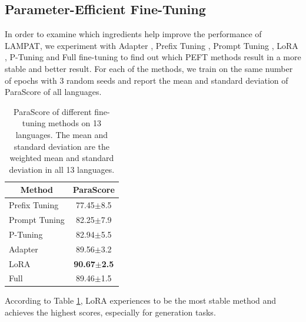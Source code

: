\documentclass[letterpaper]{article} %
\begin{document}
\subsection{Parameter-Efficient Fine-Tuning}
In order to examine which ingredients help improve the performance of LAMPAT, we experiment with Adapter \citep{pmlr-v97-houlsby19a}, Prefix Tuning \citep{li-liang-2021-prefix}, Prompt Tuning \citep{lester-etal-2021-power}, LoRA \citep{hu2021lora}, P-Tuning \citep{liu-etal-2022-p} and Full fine-tuning to find out which PEFT methods result in a more stable and better result. For each of the methods, we train on the same number of epochs with 3 random seeds and report the mean and standard deviation of ParaScore of all languages.
\begin{table}[h!]
\centering
    {\fontsize{9pt}{9pt}\selectfont\begin{tabular}{|l|c|}
        \hline
        \multicolumn{1}{|c|}{Method} & ParaScore \\ \hline
        Prefix Tuning & 77.45$\pm$8.5 \\
        Prompt Tuning & 82.25$\pm$7.9 \\
        P-Tuning & 82.94$\pm$5.5 \\
        Adapter & 89.56$\pm$3.2 \\
        LoRA & \textbf{90.67$\pm$2.5} \\
        Full & 89.46$\pm$1.5 \\ \hline
    \end{tabular}}
\caption{ParaScore of different fine-tuning methods on 13 languages. The mean and standard deviation are the weighted mean and standard deviation in all 13 languages.}
\label{tab:ablation_study}
\end{table}

According to Table \ref{tab:ablation_study}, LoRA experiences to be the most stable method and achieves the highest scores, especially for generation tasks. %

\end{document}
